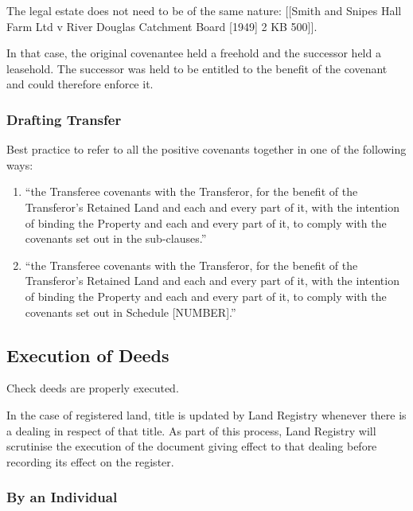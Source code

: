 \documentclass[
]{article}
\providecommand{\tightlist}{%
  \setlength{\itemsep}{0pt}\setlength{\parskip}{0pt}}
\begin{document}
The legal estate does not need to be of the same nature: {[}{[}Smith and
Snipes Hall Farm Ltd v River Douglas Catchment Board {[}1949{]} 2 KB
500{]}{]}.

In that case, the original covenantee held a freehold and the successor
held a leasehold. The successor was held to be entitled to the benefit
of the covenant and could therefore enforce it.

\hypertarget{drafting-transfer}{%
\subsubsection{Drafting Transfer}\label{drafting-transfer}}

Best practice to refer to all the positive covenants together in one of
the following ways:

\begin{enumerate}
\def\labelenumi{\arabic{enumi}.}
\tightlist
\item
  ``the Transferee covenants with the Transferor, for the benefit of the
  Transferor's Retained Land and each and every part of it, with the
  intention of binding the Property and each and every part of it, to
  comply with the covenants set out in the sub-clauses.''
\item
  ``the Transferee covenants with the Transferor, for the benefit of the
  Transferor's Retained Land and each and every part of it, with the
  intention of binding the Property and each and every part of it, to
  comply with the covenants set out in Schedule {[}NUMBER{]}.''
\end{enumerate}

\hypertarget{execution-of-deeds}{%
\subsection{Execution of Deeds}\label{execution-of-deeds}}

Check deeds are properly executed.

In the case of registered land, title is updated by Land Registry
whenever there is a dealing in respect of that title. As part of this
process, Land Registry will scrutinise the execution of the document
giving effect to that dealing before recording its effect on the
register.

\hypertarget{by-an-individual}{%
\subsubsection{By an Individual}\label{by-an-individual}}
\end{document}

